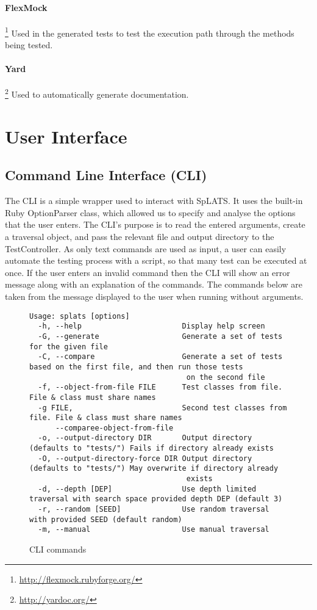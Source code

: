   \paragraph{FlexMock}\footnote{\url{http://flexmock.rubyforge.org/}} Used in the generated tests to test the execution path through the methods being tested.
  \paragraph{Yard}\footnote{\url{http://yardoc.org/}} Used to automatically generate documentation.
  
  \section{User Interface}
  \subsection{Command Line Interface (CLI)}
  
  The CLI is a simple wrapper used to interact with SpLATS. 
  It uses the built-in Ruby OptionParser class, which allowed us to specify and analyse the options that the user enters. 
  The CLI's purpose is to read the entered arguments, create a traversal object, and pass the relevant file and output directory to the TestController.
  As only text commands are used as input, a user can easily automate the testing process with a script, so that many test can be executed at once.
  If the user enters an invalid command then the CLI will show an error message along with an explanation of the commands.
  The commands below are taken from the message displayed to the user when running without arguments.
  \begin{figure}
  \scriptsize
  \begin{verbatim}
Usage: splats [options]
  -h, --help                       Display help screen
  -G, --generate                   Generate a set of tests for the given file
  -C, --compare                    Generate a set of tests based on the first file, and then run those tests
                                    on the second file
  -f, --object-from-file FILE      Test classes from file. File & class must share names
  -g FILE,                         Second test classes from file. File & class must share names
      --comparee-object-from-file
  -o, --output-directory DIR       Output directory (defaults to "tests/") Fails if directory already exists
  -O, --output-directory-force DIR Output directory (defaults to "tests/") May overwrite if directory already
                                    exists
  -d, --depth [DEP]                Use depth limited traversal with search space provided depth DEP (default 3)
  -r, --random [SEED]              Use random traversal with provided SEED (default random)
  -m, --manual                     Use manual traversal
  \end{verbatim}
  \caption{CLI commands}
  \end{figure}
